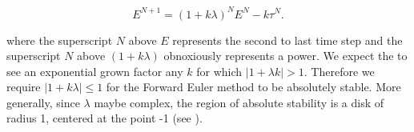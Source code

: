 \begin{tcolorbox}[colback=yellow!5!white,colframe=yellow!75!black]
    \begin{equation}
        E^{N+1} = (1+k\lambda)^N E^{N} - k \tau^N.
    \end{equation}
    
    where the superscript $N$ above $E$ represents the second to last time step and the superscript $N$ above $(1+k\lambda)$ obnoxiously represents a power. We expect the to see an exponential grown factor any $k$ for which $|1+\lambda k| > 1$. Therefore we require $|1+k\lambda| \leq 1$ for the Forward Euler method to be absolutely stable. More generally, since $\lambda$ maybe complex, the region of absolute stability is a disk of radius 1, centered at the point -1 (see ). 

    
\end{tcolorbox}

\vspace{0.5cm}

